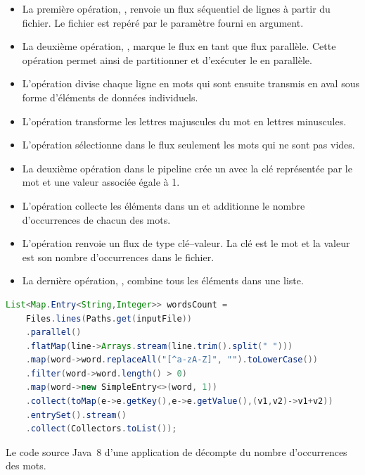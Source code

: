 \begin{itemize}
	\item La premi\`ere op\'eration, , renvoie un flux s\'equentiel de lignes \`a partir du fichier. Le fichier est rep\'er\'e par le param\`etre  fourni en argument.

	\item La deuxi\`eme op\'eration, , marque le flux en tant que flux parall\`ele. Cette op\'eration permet ainsi de partitionner et d'ex\'ecuter le  en parall\`ele.

	\item L'op\'eration  divise chaque ligne en mots qui sont ensuite transmis en aval sous forme d'\'el\'ements de donn\'ees individuels.
	
	\item L'op\'eration  transforme les lettres majuscules du mot en lettres minuscules.
	
	\item L'op\'eration  s\'electionne dans le flux seulement les mots qui ne sont pas vides.
	
	\item La deuxi\`eme op\'eration  dans le pipeline cr\'ee un  avec la cl\'e repr\'esent\'ee par le mot et une valeur associ\'ee \'egale \`a 1.
	
	\item L'op\'eration  collecte les \'el\'ements dans un  et additionne le nombre d'occurrences de chacun des mots.
	
	\item L'op\'eration  renvoie un flux de type cl\'e--valeur. La cl\'e est le mot et la valeur est son nombre d'occurrences dans le fichier.



	
	\item La derni\`ere op\'eration, , combine tous les \'el\'ements dans une liste.
	
	
\end{itemize}





\begin{Listing}[tbp]
\begin{lstlisting}[language=java]
  List<Map.Entry<String,Integer>> wordsCount = 
	Files.lines(Paths.get(inputFile))
    .parallel()
    .flatMap(line->Arrays.stream(line.trim().split(" ")))
    .map(word->word.replaceAll("[^a-zA-Z]", "").toLowerCase())
    .filter(word->word.length() > 0)
    .map(word->new SimpleEntry<>(word, 1))
    .collect(toMap(e->e.getKey(),e->e.getValue(),(v1,v2)->v1+v2))
    .entrySet().stream()
    .collect(Collectors.toList());
\end{lstlisting}
\caption{Le code source Java~8 d'une application de d\'ecompte du nombre d'occurrences des mots.}
\label{wordCountJava}
\end{Listing}




